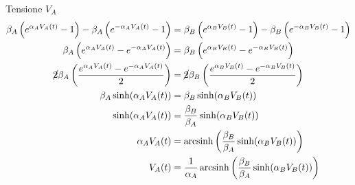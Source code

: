 \documentclass[12pt,a4paper,twoside,english,italian]{book}
\DeclareMathOperator{\arcsinh}{arcsinh}
\begin{document}
		Tensione $V_{A}$
		\begin{equation}
			\label{eq:corrente}
			\begin{split}
				\beta_{A}\left(e^{\alpha_{A}V_{A}(t)}-1\right)-\beta_{A}\left(e^{-\alpha_{A}V_{A}(t)}-1\right) &= \beta_{B}\left(e^{\alpha_{B}V_{B}(t)}-1\right)-\beta_{B}\left(e^{-\alpha_{B}V_{B}(t)}-1\right)\\
				\beta_{A}\left(e^{\alpha_{A}V_{A}(t)}-e^{-\alpha_{A}V_{A}(t)}\right) &= \beta_{B}\left(e^{\alpha_{B}V_{B}(t)}-e^{-\alpha_{B}V_{B}(t)}\right)\\
				\cancel{2}\beta_{A}\left(\frac{e^{\alpha_{A}V_{A}(t)}-e^{-\alpha_{A}V_{A}(t)}}{2}\right) &= \cancel{2}\beta_{B}\left(\frac{e^{\alpha_{B}V_{B}(t)}-e^{-\alpha_{B}V_{B}(t)}}{2}\right)\\
				\beta_{A} \sinh(\alpha_{A}V_{A}(t)) &= \beta_{B} \sinh(\alpha_{B}V_{B}(t))\\
				\sinh(\alpha_{A}V_{A}(t)) &= \frac{\beta_{B}}{\beta_{A}} \sinh(\alpha_{B}V_{B}(t))\\
				\alpha_{A}V_{A}(t) &= \arcsinh \left(\frac{\beta_{B}}{\beta_{A}} \sinh(\alpha_{B}V_{B}(t))\right)\\
				V_{A}(t) &= \frac{1}{\alpha_{A}} \arcsinh \left(\frac{\beta_{B}}{\beta_{A}} \sinh(\alpha_{B}V_{B}(t))\right)
			\end{split}
		\end{equation}
		
\end{document}
